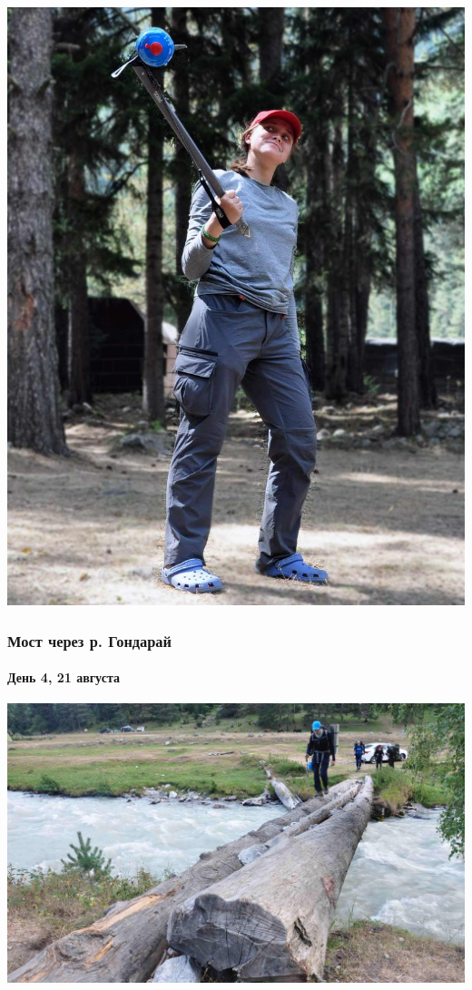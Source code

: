 \begin{frame}
{\begin{minipage}{\fourpicsize}
			\includegraphics[width=\textwidth]{../pics/DSC_1152}			
		\end{minipage}
		\vfill
	}
\end{frame}

\begin{frame}
	\frametitle{Мост через р. Гондарай}
	\framesubtitle{День 4, 21 августа}
	\centering
	\includegraphics[width=\textwidth]{../pics/DSC_1167}			
\end{frame}

